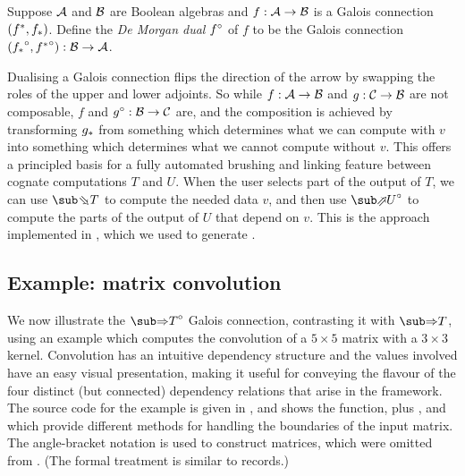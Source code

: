 \begin{definition}
   Suppose $\mathcal{A}$ and $\mathcal{B}$ are Boolean algebras and $f: \mathcal{A} \to \mathcal{B}$ is a Galois connection $({f}^*,{f}_*)$. Define the \emph{De Morgan dual} ${f}^{\circ}$ of $f$ to be the Galois connection $({{f}_*}^{\circ}, {{f}^*}^{\circ}): \mathcal{B} \to \mathcal{A}$.
\end{definition}

\noindent Dualising a Galois connection flips the direction of the arrow by swapping the roles of the upper and lower adjoints. So while $f: \mathcal{A} \to \mathcal{B}$ and $g: \mathcal{C} \to \mathcal{B}$ are not composable, $f$ and ${g}^{\circ}: \mathcal{B} \to \mathcal{C}$ are, and the composition is achieved by transforming ${g}_*$ from something which determines what we can compute with $v$ into something which determines what we cannot compute without $v$. This offers a principled basis for a fully automated brushing and linking feature between cognate computations $T$ and $U$. When the user selects part of the output of $T$, we can use $\evalBwdF{T}$ to compute the needed data $v$, and then use $\dual{\evalFwdF{U}}$ to compute the parts of the output of $U$ that depend on $v$. This is the approach implemented in \OurLanguage, which we used to generate .

\subsection{Example: matrix convolution}

We now illustrate the $\dual{\evalGC{T}}$ Galois connection, contrasting it with $\evalGC{T}$, using an example which computes the convolution of a $5 \times 5$ matrix with a $3 \times 3$ kernel. Convolution has an intuitive dependency structure and the values involved have an easy visual presentation, making it useful for conveying the flavour of the four distinct (but connected) dependency relations that arise in the framework. The source code for the example is given in , and shows the  function, plus ,  and  which provide different methods for handling the boundaries of the input matrix. The angle-bracket notation is used to construct matrices, which were omitted from . (The formal treatment is similar to records.)



